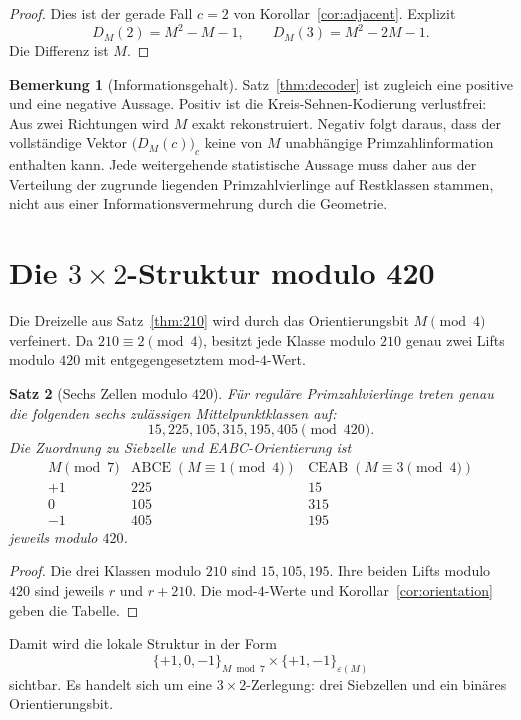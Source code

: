 \documentclass[11pt,a4paper]{article}
\newtheorem{satz}{Satz}[section]
\theoremstyle{definition}
\newtheorem{bemerkung}[satz]{Bemerkung}
\theoremstyle{remark}
\newcommand{\eps}{\varepsilon}
\newcommand{\ABCE}{\mathrm{ABCE}}
\newcommand{\CEAB}{\mathrm{CEAB}}
\begin{document}
\begin{proof}
Dies ist der gerade Fall $c=2$ von Korollar~\ref{cor:adjacent}. Explizit
\[
D_M(2)=M^2-M-1,\qquad D_M(3)=M^2-2M-1.
\]
Die Differenz ist $M$.
\end{proof}

\begin{bemerkung}[Informationsgehalt]
Satz~\ref{thm:decoder} ist zugleich eine positive und eine negative Aussage. Positiv ist die Kreis-Sehnen-Kodierung verlustfrei: Aus zwei Richtungen wird $M$ exakt rekonstruiert. Negativ folgt daraus, dass der vollständige Vektor $\bigl(D_M(c)\bigr)_c$ keine von $M$ unabhängige Primzahlinformation enthalten kann. Jede weitergehende statistische Aussage muss daher aus der Verteilung der zugrunde liegenden Primzahlvierlinge auf Restklassen stammen, nicht aus einer Informationsvermehrung durch die Geometrie.
\end{bemerkung}

\section{Die \texorpdfstring{$3\times2$}{3x2}-Struktur modulo 420}

Die Dreizelle aus Satz~\ref{thm:210} wird durch das Orientierungsbit $M\pmod4$ verfeinert. Da $210\equiv2\pmod4$, besitzt jede Klasse modulo $210$ genau zwei Lifts modulo $420$ mit entgegengesetztem mod-$4$-Wert.

\begin{satz}[Sechs Zellen modulo $420$]\label{thm:420}
Für reguläre Primzahlvierlinge treten genau die folgenden sechs zulässigen Mittelpunktklassen auf:
\[
\boxed{15,225,105,315,195,405\pmod{420}.}
\]
Die Zuordnung zu Siebzelle und EABC-Orientierung ist
\[
\begin{array}{c|cc}
M\pmod7 & \ABCE\;(M\equiv1\!\pmod4) & \CEAB\;(M\equiv3\!\pmod4)\\ \hline
+1&225&15\\
0&105&315\\
-1&405&195
\end{array}
\]
jeweils modulo $420$.
\end{satz}

\begin{proof}
Die drei Klassen modulo $210$ sind $15,105,195$. Ihre beiden Lifts modulo $420$ sind jeweils $r$ und $r+210$. Die mod-$4$-Werte und Korollar~\ref{cor:orientation} geben die Tabelle.
\end{proof}

Damit wird die lokale Struktur in der Form
\[
\boxed{
\{+1,0,-1\}_{M\bmod7}\times\{+1,-1\}_{\eps(M)}
}
\]
sichtbar. Es handelt sich um eine $3\times2$-Zerlegung: drei Siebzellen und ein binäres Orientierungsbit.
\end{document}
